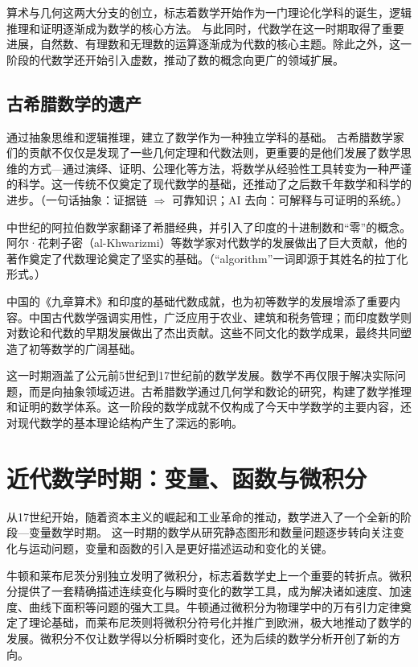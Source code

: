 算术与几何这两大分支的创立，标志着数学开始作为一门理论化学科的诞生，逻辑推理和证明逐渐成为数学的核心方法。
与此同时，代数学在这一时期取得了重要进展，自然数、有理数和无理数的运算逐渐成为代数的核心主题。除此之外，这一阶段的代数学还开始引入虚数，推动了数的概念向更广的领域扩展。

\subsection{古希腊数学的遗产}
通过抽象思维和逻辑推理，建立了数学作为一种独立学科的基础。
古希腊数学家们的贡献不仅仅是发现了一些几何定理和代数法则，更重要的是他们发展了数学思维的方式---通过演绎、证明、公理化等方法，将数学从经验性工具转变为一种严谨的科学。这一传统不仅奠定了现代数学的基础，还推动了之后数千年数学和科学的进步。{（一句话抽象：证据链 $\Rightarrow$ 可靠知识；AI 去向：可解释与可证明的系统。）}

中世纪的阿拉伯数学家翻译了希腊经典，并引入了印度的十进制数和“零”的概念。阿尔·花剌子密（al-Khwarizmi）等数学家对代数学的发展做出了巨大贡献，他的著作奠定了代数理论奠定了坚实的基础。{（“algorithm”一词即源于其姓名的拉丁化形式。）}

中国的《九章算术》和印度的基础代数成就，也为初等数学的发展增添了重要内容。中国古代数学强调实用性，广泛应用于农业、建筑和税务管理；而印度数学则对数论和代数的早期发展做出了杰出贡献。这些不同文化的数学成果，最终共同塑造了初等数学的广阔基础。

这一时期涵盖了公元前5世纪到17世纪前的数学发展。数学不再仅限于解决实际问题，而是向抽象领域迈进。古希腊数学通过几何学和数论的研究，构建了数学推理和证明的数学体系。这一阶段的数学成就不仅构成了今天中学数学的主要内容，还对现代数学的基本理论结构产生了深远的影响。

\section{近代数学时期：变量、函数与微积分}
从17世纪开始，随着资本主义的崛起和工业革命的推动，数学进入了一个全新的阶段---变量数学时期。
这一时期的数学从研究静态图形和数量问题逐步转向关注变化与运动问题，变量和函数的引入是更好描述运动和变化的关键。

牛顿和莱布尼茨分别独立发明了微积分，标志着数学史上一个重要的转折点。微积分提供了一套精确描述连续变化与瞬时变化的数学工具，成为解决诸如速度、加速度、曲线下面积等问题的强大工具。牛顿通过微积分为物理学中的万有引力定律奠定了理论基础，而莱布尼茨则将微积分符号化并推广到欧洲，极大地推动了数学的发展。微积分不仅让数学得以分析瞬时变化，还为后续的数学分析开创了新的方向。

